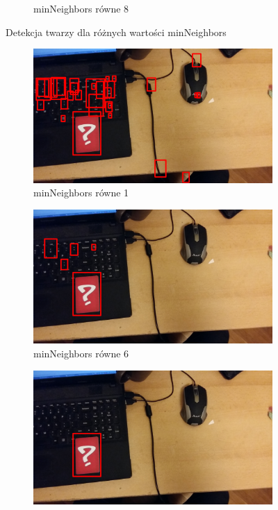 \documentclass{article}
\numberwithin{equation}{section}
\begin{document}
\begin{figure}[H]
\begin{subfigure}{0.32\textwidth}
        \caption{minNeighbors równe 8}
        \label{fig:somsiadTwarze8}
    \end{subfigure}
    \caption{Detekcja twarzy dla różnych wartości minNeighbors}
    \label{twarzeeSomsiady}
\end{figure}

\begin{figure}[H]
    \centering
        \begin{subfigure}{0.32\textwidth}
        \centering
        \includegraphics[width=\linewidth]{somsiadd1.jpg}
        \caption{minNeighbors równe 1}
        \label{fig:somsiadKarta1}
    \end{subfigure}\hfill
    \begin{subfigure}{0.32\textwidth}
        \centering
        \includegraphics[width=\linewidth]{somsiadd6.jpg}
        \caption{minNeighbors równe 6}
        \label{fig:somsiadKarta6}
    \end{subfigure}\hfill
    \begin{subfigure}{0.32\textwidth}
        \centering
        \includegraphics[width=\linewidth]{somsiadd16.jpg}

\end{subfigure}
\end{figure}
\end{document}
